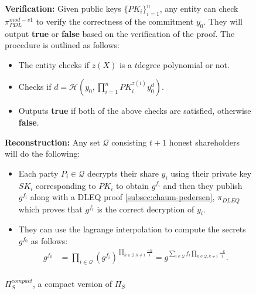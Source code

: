 \begin{figure}[ht]
{\begin{tcolorbox}[title=$\Pi_{S}^{compact}$, width=1.2\textwidth, colframe=blue!75!black, colback=blue!10, sharp corners]
        \vspace{0.5em}
        \textbf{Verification:}
            Given public keys $\{PK_i\}_{i=1}^n$, any entity can check 
            $\pi_{PDL}^{mod-v1}$ to verify the correctness of the commitment $y_0$. 
            They will output \textbf{true} or \textbf{false} based on the verification of the proof. The 
            procedure is outlined as follows:
        \begin{itemize}
            \item The entity checks if $z(X)$ is a $t$degree polynomial or not.
            \item Checks if $d=\mathcal{H}(y_0,\prod_{i=1}^{n}{PK_i^{z(i)}}{y_0^d})$.
            \item Outputs \textbf{true} if both of the above checks are satisfied, otherwise \textbf{false}.
        \end{itemize}

        \vspace{0.5em}
        \textbf{Reconstruction:}
            Any set $\mathcal{Q}$ consisting $t+1$ honest shareholders will do the following:
            \begin{itemize}
                \item Each party $P_i\in\mathcal{Q}$ decrypts their share $y_i$ using their private key $SK_i$ 
                    corresponding to $PK_i$ to obtain $g^{f_i}$ and then they publish $g^{f_i}$ 
                    along with a DLEQ proof \ref{subsec:chaum-pedersen}, $\pi_{DLEQ}$ which proves that 
                    $g^{f_i}$ is the correct decryption of $y_i$.
                \item They can use the 
                lagrange interpolation to compute the secrets $g^{f_0}$ as follows:
                \begin{align*}
                    g^{f_0} &= \prod_{i\in\mathcal{Q}}(g^{f_i})^{\prod_{k\in\mathcal{Q},k\neq i}\frac{-k}{i}}= g^{\sum_{i\in\mathcal{Q}}f_i\prod_{k\in\mathcal{Q},k\neq i}\frac{-k}{i}}.\\
                \end{align*}
            \end{itemize}
    \end{tcolorbox}
    }
    \caption[PVSS]{$\Pi_{S}^{compact}$, a compact version of $\Pi_{S}$}
    \label{fig:compact-PVSS-ro}
\end{figure}
